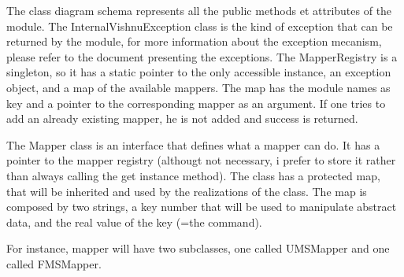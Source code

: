 \documentclass{article}
\begin{document}
The class diagram schema represents all the public methods et attributes of the 
module.
The InternalVishnuException class is the kind of exception that can be returned
by the module, for more information about the exception mecanism, please refer 
to the document presenting the exceptions.
The MapperRegistry is a singleton, so it has a static pointer to the only 
accessible instance, an exception object, and a map of the available mappers.
The map has the module names as key and a pointer to the corresponding mapper as 
an argument. If one tries to add an already existing mapper, he is not added and 
success is returned.

The Mapper class is an interface that defines what a mapper can do. It has a 
pointer to the mapper registry (althougt not necessary, i prefer to store it 
rather than always calling the get instance method).
The class has a protected map, that will be inherited and used by the 
realizations of the class.
The map is composed by two strings, a key number that will be used to manipulate 
abstract data, and the real value of the key (=the command).

For instance, mapper will have two subclasses, one called UMSMapper and one 
called FMSMapper.
\end{document}
